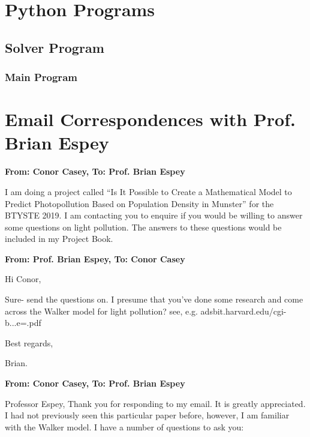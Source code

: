 \begin{appendix}
\newpage

\section*{Python Programs}
\subsection*{Solver Program}


\hfill

\subsubsection*{Main Program}


\section*{Email Correspondences with Prof. Brian Espey}

\author{Conor Casey \\ email \href{mailto:16ccasey@student.kenmarecs.com}{16ccasey@student.kenmarecs.com} 
   \and Prof. Brian Espey \\ email \href{mailto:someone@somewhere.com}{someone@somewhere.com} 
}

\textbf{From: Conor Casey, To: Prof. Brian Espey}

I am doing a project called “Is It Possible to Create a Mathematical Model to Predict Photopollution Based on Population Density in Munster” for the BTYSTE 2019.
I am contacting you to enquire if you would be willing to answer some questions on light pollution. The answers to these questions would be included in my Project Book. 


\textbf{From: Prof. Brian Espey, To: Conor Casey}

Hi Conor,

Sure- send the questions on. I presume that you've done some research and come across the Walker model for light pollution? see, e.g. adsbit.harvard.edu/cgi-b...e=.pdf

Best regards,

Brian.



\textbf{From: Conor Casey, To: Prof. Brian Espey}

Professor Espey,
Thank you for responding to my email. It is greatly appreciated.
I had not previously seen this particular paper before, however, I am familiar with the Walker model.
I have a number of questions to ask you:


\end{appendix}
